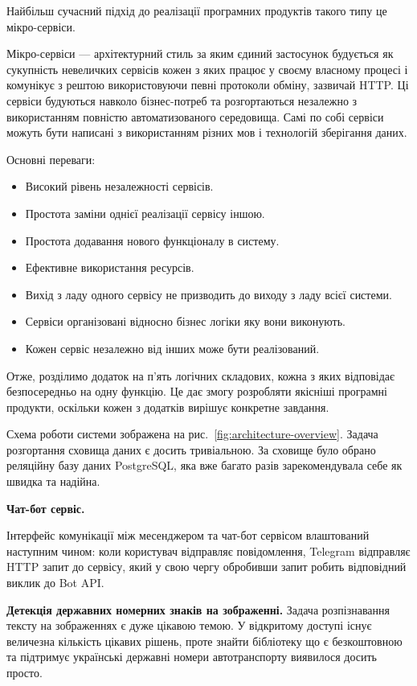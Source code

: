 Найбільш сучасний підхід до реалізації програмних продуктів такого типу це мікро-сервіси.

Мікро-сервіси — архітектурний стиль за яким єдиний застосунок будується
як сукупність невеличких сервісів кожен з яких працює у своєму власному
процесі і комунікує з рештою використовуючи певні протоколи обміну,
зазвичай HTTP. Ці сервіси будуються навколо бізнес-потреб та розгортаються
незалежно з використанням повністю автоматизованого середовища.
Самі по собі сервіси можуть бути написані з використанням різних мов і технологій
зберігання даних.

Основні переваги:

\begin{itemize}
  \item Високий рівень незалежності сервісів.
  \item Простота заміни однієї реалізації сервісу іншою.
  \item Простота додавання нового функціоналу в систему.
  \item Ефективне використання ресурсів.
  \item Вихід з ладу одного сервісу не призводить до виходу з ладу всієї системи.
  \item Сервіси організовані відносно бізнес логіки яку вони виконують.
  \item Кожен сервіс незалежно від інших може бути реалізований.
\end{itemize}

Отже, розділимо додаток на п'ять логічних складових,
кожна з яких відповідає безпосередньо на одну функцію.
Це дає змогу розробляти якісніші програмні продукти,
оскільки кожен з додатків вирішує конкретне завдання.

Схема роботи системи зображена на рис.~\ref{fig:architecture-overview}.
Задача розгортання сховища даних є досить тривіальною.
За сховище було обрано реляційну базу даних PostgreSQL,
яка вже багато разів зарекомендувала себе як швидка та надійна.

\textbf{Чат-бот сервіс.}

Інтерфейс комунікації між месенджером та чат-бот сервісом влаштований наступним чином:
коли користувач відправляє повідомлення, Telegram відправляє HTTP запит до сервісу,
який у свою чергу обробивши запит робить відповідний виклик до Bot API.

\textbf{Детекція державних номерних знаків на зображенні.}
Задача розпізнавання тексту на зображеннях є дуже цікавою темою.
У відкритому доступі існує величезна кількість цікавих рішень, проте
знайти бібліотеку що є безкоштовною та підтримує
українські державні номери автотранспорту виявилося досить просто.

